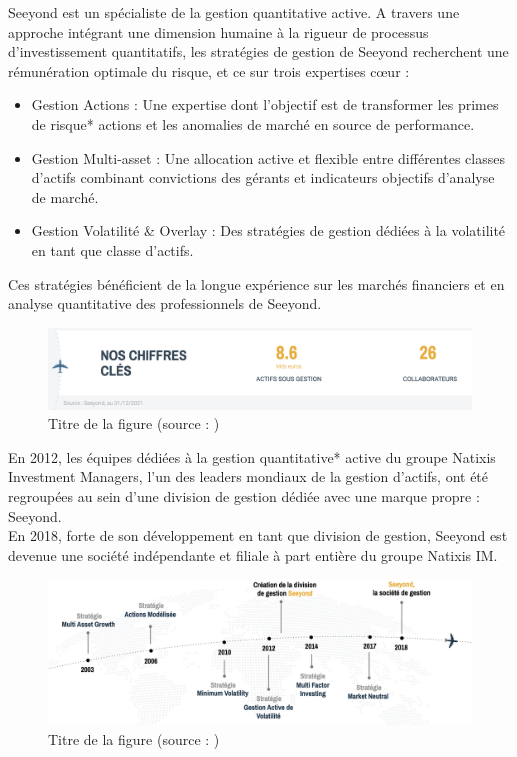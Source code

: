 Seeyond est un spécialiste de la gestion quantitative active. A travers une approche intégrant une dimension humaine à la rigueur de processus d’investissement quantitatifs, les stratégies de gestion de Seeyond recherchent une rémunération optimale du risque, et ce sur trois expertises cœur : 
\begin{itemize}
\item Gestion Actions : Une expertise dont l’objectif est de transformer les primes de risque* actions et les anomalies de marché en source de performance.
\item Gestion Multi-asset : Une allocation active et flexible entre différentes classes d’actifs combinant convictions des gérants et indicateurs objectifs d’analyse de marché.
\item Gestion Volatilité \& Overlay : Des stratégies de gestion dédiées à la volatilité en tant que classe d’actifs.
\end{itemize}

Ces stratégies bénéficient de la longue expérience sur les marchés financiers et en analyse quantitative des professionnels de Seeyond.

\begin{figure}[h!]
  \caption{Titre de la figure (source : \cite{arrow48})}
  \includegraphics[width=\linewidth]{./img/intro/seeyond_kpi}
\end{figure}


En 2012, les équipes dédiées à la gestion quantitative* active du groupe Natixis Investment Managers, l’un des leaders mondiaux de la gestion d’actifs, ont été regroupées au sein d’une division de gestion dédiée avec une marque propre : Seeyond.
\\
En 2018, forte de son développement en tant que division de gestion, Seeyond est devenue une société indépendante et filiale à part entière du groupe Natixis IM.

\begin{figure}[h!]
  \caption{Titre de la figure (source : )}
  \includegraphics[width=\linewidth]{./img/intro/seeyond_hist}
\end{figure}




